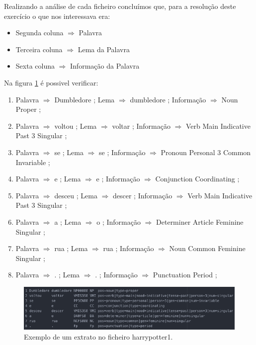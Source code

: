 \documentclass[11pt,a4paper]{report}
\begin{document}
Realizando a análise de cada ficheiro concluímos que, para a resolução deste exercício o que nos interessava era:

\begin{itemize}
 \item Segunda coluna $\Rightarrow$ Palavra
 \item Terceira coluna $\Rightarrow$ Lema da Palavra
 \item Sexta coluna $\Rightarrow$ Informação da Palavra
\end{itemize}

\vspace{0.5cm}

Na figura \ref{img:analise4} é possivel verificar:

\begin{enumerate}
	\item Palavra $\Rightarrow$ Dumbledore ; Lema $\Rightarrow$ dumbledore ; Informação $\Rightarrow$ Noun Proper ;
	\item Palavra $\Rightarrow$ voltou ; Lema $\Rightarrow$ voltar ; Informação $\Rightarrow$ Verb Main Indicative Past 3 Singular ;
	\item Palavra $\Rightarrow$ se ; Lema $\Rightarrow$ se ; Informação $\Rightarrow$ Pronoun Personal 3 Common Invariable ;
	\item Palavra $\Rightarrow$ e ; Lema $\Rightarrow$ e ; Informação $\Rightarrow$ Conjunction Coordinating ;
	\item Palavra $\Rightarrow$ desceu ; Lema $\Rightarrow$ descer ; Informação $\Rightarrow$ Verb Main Indicative Past 3 Singular ;
	\item Palavra $\Rightarrow$ a ; Lema $\Rightarrow$ o ; Informação $\Rightarrow$ Determiner Article Feminine Singular ;
	\item Palavra $\Rightarrow$ rua ; Lema $\Rightarrow$ rua ; Informação $\Rightarrow$ Noun Common Feminine Singular ;
	\item Palavra $\Rightarrow$ . ; Lema $\Rightarrow$ . ; Informação $\Rightarrow$ Punctuation Period ;
\end{enumerate}


\begin{figure}[H]
\centering
\includegraphics[scale=0.6]{analise4.png}
\caption{Exemplo de um extrato no ficheiro harrypotter1.}
\label{img:analise4}
\end{figure}
\end{document}
